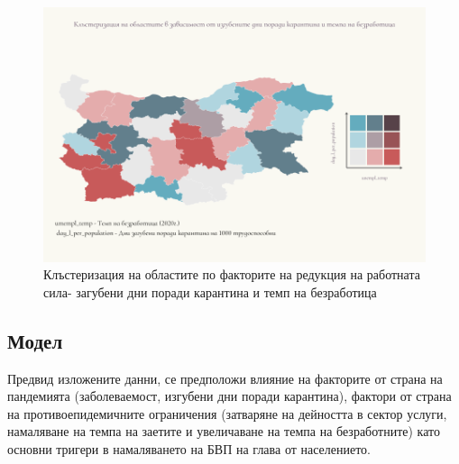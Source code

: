 \documentclass[a4paper,12pt]{article}
\begin{document}
\newpage
\begin{figure}[H]

	\centering
	\hspace*{-2cm}
	\vspace*{-2 cm}
	\includegraphics[width=1.5\textwidth,height= 20 cm, angle =90 ]{../graphics/Graph_2}
	\caption{{\scriptsize Клъстеризация на областите по факторите на редукция на работната сила- загубени дни поради карантина и темп на безработица}}
	\label{fig:graph2}
\end{figure}
\newpage

\subsection{Модел} 

Предвид изложените данни, се предположи влияние на факторите от страна на пандемията (заболеваемост, изгубени дни поради карантина), фактори от страна на противоепидемичните ограничения (затваряне на дейността в сектор услуги, намаляване на темпа на заетите и увеличаване на темпа на безработните) като основни тригери в намаляването на БВП на глава от населението. 
\end{document}
